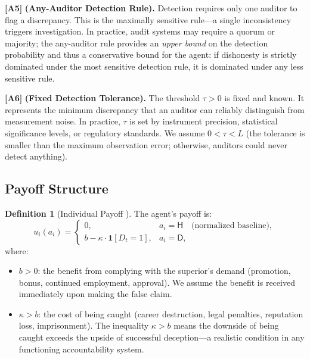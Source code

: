 \documentclass[11pt,a4paper]{article}
\theoremstyle{definition}
\newtheorem{definition}[theorem]{Definition}
\theoremstyle{remark}
\newcommand{\assumptionTag}[1]{\textsf{\textbf{[A#1]}}}
\newcommand{\ind}[1]{\mathbf{1}[#1]}
\newcommand{\honest}{\mathsf{H}}
\newcommand{\dishonest}{\mathsf{D}}
\newcommand{\threshold}{\tau}
\newcommand{\tol}{L}
\newcommand{\benefit}{b}
\newcommand{\cost}{\kappa}
\begin{document}
\assumptionTag{5} \textbf{(Any-Auditor Detection Rule).} Detection requires only one auditor to flag a discrepancy. This is the maximally sensitive rule---a single inconsistency triggers investigation. In practice, audit systems may require a quorum or majority; the any-auditor rule provides an \emph{upper bound} on the detection probability and thus a conservative bound for the agent: if dishonesty is strictly dominated under the most sensitive detection rule, it is dominated under any less sensitive rule.

\assumptionTag{6} \textbf{(Fixed Detection Tolerance).} The threshold $\threshold > 0$ is fixed and known. It represents the minimum discrepancy that an auditor can reliably distinguish from measurement noise. In practice, $\threshold$ is set by instrument precision, statistical significance levels, or regulatory standards. We assume $0 < \threshold < \tol$ (the tolerance is smaller than the maximum observation error; otherwise, auditors could never detect anything).

\subsection{Payoff Structure }

\begin{definition}[Individual Payoff ]
\label{def:payoff}
The agent's payoff is:
\begin{equation}
    u_i(a_i) = \begin{cases}
        0, & a_i = \honest \quad \text{(normalized baseline)}, \\[6pt]
        \benefit - \cost \cdot \ind{D_t = 1}, & a_i = \dishonest,
    \end{cases}
\end{equation}
where:
\begin{itemize}[nosep]
    \item $\benefit > 0$: the benefit from complying with the superior's demand (promotion, bonus, continued employment, approval). We assume the benefit is received immediately upon making the false claim.
    \item $\cost > \benefit$: the cost of being caught (career destruction, legal penalties, reputation loss, imprisonment). The inequality $\cost > \benefit$ means the downside of being caught exceeds the upside of successful deception---a realistic condition in any functioning accountability system.
\end{itemize}
\end{definition}
\end{document}
